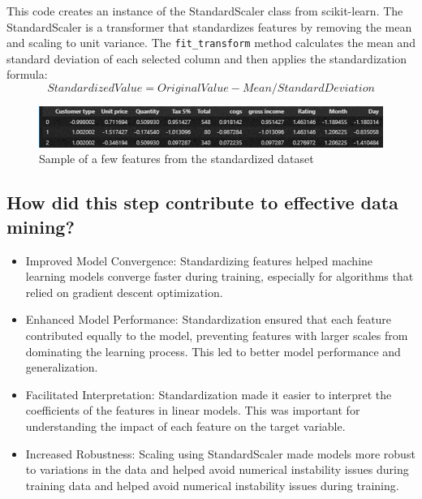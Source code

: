 This code creates an instance of the StandardScaler class from scikit-learn. The StandardScaler is a transformer that standardizes features by removing the mean and scaling to unit variance. 
The \verb|fit_transform| method calculates the mean and standard deviation of each selected column and then applies the standardization formula:
\begin{equation}
Standardized Value = Original Value-Mean/Standard Deviation
\end{equation}

\begin{figure}[h]
    \centering
    \includegraphics[width=1\textwidth]{Chapters/ch2/data_1.png}
    \caption{Sample of a few features from the standardized dataset}
\end{figure}

\subsection{How did this step contribute to effective data mining?}

\begin{itemize}
\item Improved Model Convergence: Standardizing features helped machine learning models converge faster during training, especially for algorithms that relied on gradient descent optimization.
\item Enhanced Model Performance: Standardization ensured that each feature contributed equally to the model, preventing features with larger scales from dominating the learning process. This led to better model performance and generalization.
\item Facilitated Interpretation: Standardization made it easier to interpret the coefficients of the features in linear models. This was important for understanding the impact of each feature on the target variable.
\item Increased Robustness: Scaling using StandardScaler made models more robust to variations in the data and helped avoid numerical instability issues during training data and helped avoid numerical instability issues during training.
\end{itemize}


